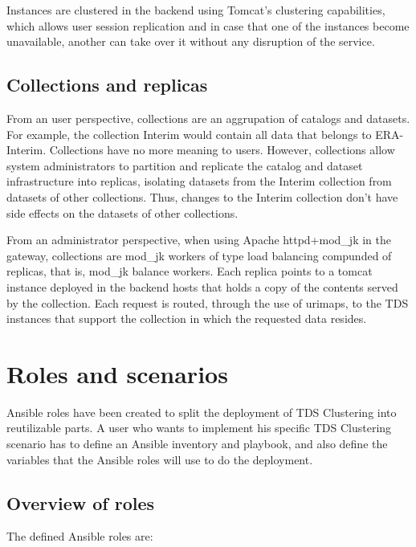 \documentclass[a4paper,12pt]{article}
\begin{document}
Instances are clustered in the backend using Tomcat's clustering capabilities, which allows user session replication and in case that one of the instances become unavailable, another can take over it without any disruption of the service.

\subsection{Collections and replicas}

From an user perspective, collections are an aggrupation of catalogs and datasets. For example, the collection Interim would contain all data that belongs to ERA-Interim. Collections have no more meaning to users. However, collections allow system administrators to partition and replicate the catalog and dataset infrastructure into replicas, isolating datasets from the Interim collection from datasets of other collections. Thus, changes to the Interim collection don't have side effects on the datasets of other collections. 

From an administrator perspective, when using Apache httpd+mod\_jk in the gateway, collections are mod\_jk workers of type load balancing compunded of replicas, that is, mod\_jk balance workers. Each replica points to a tomcat instance deployed in the backend hosts that holds a copy of the contents served by the collection. Each request is routed, through the use of urimaps, to the TDS instances that support the collection in which the requested data resides.

\section{Roles and scenarios}

Ansible roles have been created to split the deployment of TDS Clustering into reutilizable parts. A user who wants to implement his specific TDS Clustering scenario has to define an Ansible inventory and playbook, and also define the variables that the Ansible roles will use to do the deployment.

\subsection{Overview of roles}

The defined Ansible roles are:
\end{document}
